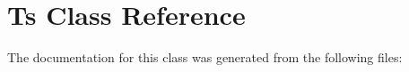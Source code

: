 \hypertarget{classTs}{}\section{Ts Class Reference}
\label{classTs}


The documentation for this class was generated from the following files\+: